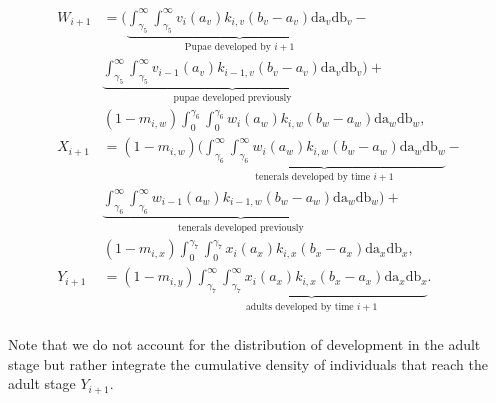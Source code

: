 \documentclass[12pt]{article}
\begin{document}
\begin{align*}
W_{i+1} &= \bigg(\underbrace{\int_{\gamma_5}^{\infty}\int_{\gamma_5}^{\infty} v_i(a_v)k_{i,v}(b_v-a_v)\text{da}_v \text{db}_v}_{\text{Pupae developed by $i+1$}} -\\
& \underbrace{\int_{\gamma_5}^{\infty}\int_{\gamma_5}^{\infty} v_{i-1}(a_v)k_{i-1,v}(b_v-a_v)\text{da}_v \text{db}_v}_{\text{pupae developed previously}}\bigg)+\\
& (1 - m_{i,w})\int_0^{\gamma_6} \int_0^{\gamma_6} w_i(a_w)k_{i,w}(b_w-a_w)\text{da}_w\text{db}_w, \tag{eqn A4.1g}\\
X_{i+1} &= (1 - m_{i,w})\bigg(\underbrace{\int_{\gamma_6}^{\infty}\int_{\gamma_6}^{\infty} w_i(a_w)k_{i,w}(b_w - a_w)\text{da}_w\text{db}_w}_{\text{tenerals developed by time $i+1$}} -\\
& \underbrace{\int_{\gamma_6}^{\infty}\int_{\gamma_6}^{\infty} w_{i-1}(a_w)k_{i-1,w}(b_w - a_w)\text{da}_w\text{db}_w}_{\text{tenerals developed previously}}\bigg)+\\
& (1 - m_{i,x})\int_0^{\gamma_7}\int_0^{\gamma_7} x_i(a_x)k_{i,x}(b_x - a_x)\text{da}_x\text{db}_x, \tag{eqn A4.1h}\\
Y_{i+1} &= (1-m_{i,y})\underbrace{\int_{\gamma_7}^{\infty}\int_{\gamma_7}^{\infty} x_i(a_x)k_{i,x}(b_x - a_x)\text{da}_x\text{db}_x}_{\text{adults developed by time $i+1$}}. \tag{eqn A4.1i}\\
\end{align*}

Note that we do not account for the distribution of development in the adult stage but rather integrate the cumulative density of individuals that reach the adult stage $Y_{i+1}$.



\end{document}
